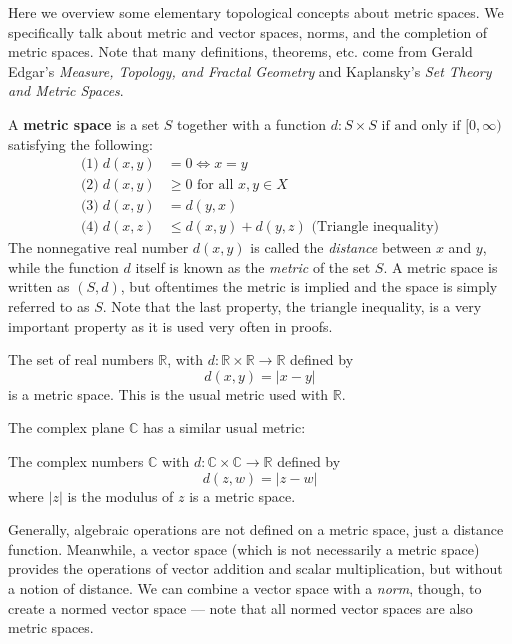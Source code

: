 Here we overview some elementary topological concepts about metric spaces.  We specifically talk about metric and vector spaces, norms, and the completion of metric spaces.  Note that many definitions, theorems, etc. come from Gerald Edgar's \textit{Measure, Topology, and Fractal Geometry}\cite{Edgar} and Kaplansky's \textit{Set Theory and Metric Spaces}\cite{Kaplansky}.

\begin{defn}
A \textbf{metric space} is a set $S$ together with a function $d:S \times S \textrm{ if and only if } [0, \infty)$ satisfying the following:
\begin{align*}
\textrm{(1)}\; d(x,y) &= 0 \Leftrightarrow x = y\\
\textrm{(2)}\; d(x,y) &\geq 0 \textrm{ for all } x,y \in X\\
\textrm{(3)}\; d(x,y) &= d(y,x)\\
\textrm{(4)}\; d(x,z) &\leq d(x,y) + d(y,z) \textrm{ (Triangle inequality)}
\end{align*}
The nonnegative real number $d(x,y)$ is called the \textit{distance} between $x$ and $y$, while the function $d$ itself is known as the \textit{metric} of the set $S$.  A metric space is written as $(S, d)$, but oftentimes the metric is implied and the space is simply referred to as $S$.  Note that the last property, the triangle inequality, is a very important property as it is used very often in proofs.
\end{defn}

\begin{example}
The set of real numbers $\mathbb{R}$, with $d: \mathbb{R} \times \mathbb{R} \rightarrow \mathbb{R}$ defined by
\[d(x,y) = |x - y| \]
is a metric space.  This is the usual metric used with $\mathbb{R}$.
\end{example}

The complex plane $\mathbb{C}$ has a similar usual metric:

\begin{example}
The complex numbers $\mathbb{C}$ with $d: \mathbb{C} \times \mathbb{C} \rightarrow \mathbb{R}$ defined by
\[d(z,w) = |z - w| \]
where $|z|$ is the modulus of $z$ is a metric space.
\end{example}

Generally, algebraic operations are not defined on a metric space, just a distance function.  Meanwhile, a vector space (which is not necessarily a metric space) provides the operations of vector addition and scalar multiplication, but without a notion of distance.  We can combine a vector space with a \textit{norm}, though, to create a normed vector space --- note that all normed vector spaces are also metric spaces.

